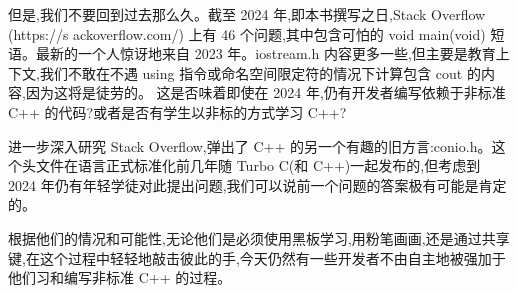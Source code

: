 但是,我们不要回到过去那么久。截至 2024 年,即本书撰写之日,Stack Overflow (https://s ackoverflow.com/) 上有 46 个问题,其中包含可怕的 void main(void) 短语。最新的一个人惊讶地来自 2023 年。iostream.h 内容更多一些,但主要是教育上下文,我们不敢在不遇 using 指令或命名空间限定符的情况下计算包含 cout 的内容,因为这将是徒劳的。 这是否味着即使在 2024 年,仍有开发者编写依赖于非标准 C++ 的代码?或者是否有学生以非标的方式学习 C++? 

进一步深入研究 Stack Overflow,弹出了 C++ 的另一个有趣的旧方言:conio.h。这个头文件在语言正式标准化前几年随 Turbo C(和 C++)一起发布的,但考虑到 2024 年仍有年轻学徒对此提出问题,我们可以说前一个问题的答案极有可能是肯定的。

根据他们的情况和可能性,无论他们是必须使用黑板学习,用粉笔画画,还是通过共享键,在这个过程中轻轻地敲击彼此的手,今天仍然有一些开发者不由自主地被强加于他们习和编写非标准 C++ 的过程。